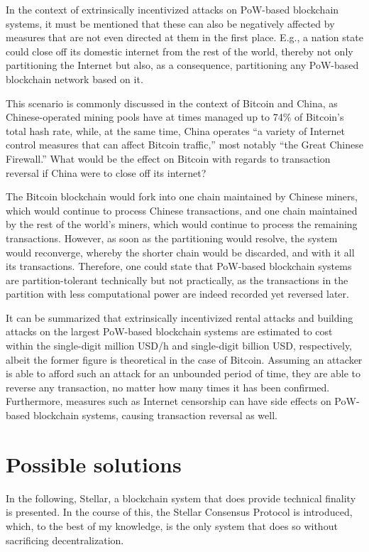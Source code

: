 In the context of extrinsically incentivized attacks on PoW-based blockchain systems, it must be mentioned that these can also be negatively affected by measures that are not even directed at them in the first place.
E.g., a nation state could close off its domestic internet from the rest of the world, thereby not only partitioning the Internet but also, as a consequence, partitioning any PoW-based blockchain network based on it.

This scenario is commonly discussed in the context of Bitcoin and China, as Chinese-operated mining pools have at times managed up to 74\% of Bitcoin's total hash rate, while, at the same time, China operates ``a variety of Internet control measures that can affect Bitcoin traffic,'' most notably ``the Great Chinese Firewall.'' \autocite[5]{kaiser2018}
What would be the effect on Bitcoin with regards to transaction reversal if China were to close off its internet?

The Bitcoin blockchain would fork into one chain maintained by Chinese miners, which would continue to process Chinese transactions, and one chain maintained by the rest of the world's miners, which would continue to process the remaining transactions.
However, as soon as the partitioning would resolve, the system would reconverge, whereby the shorter chain would be discarded, and with it all its transactions.
Therefore, one could state that PoW-based blockchain systems are partition-tolerant technically but not practically, as the transactions in the partition with less computational power are indeed recorded yet reversed later.

It can be summarized that extrinsically incentivized rental attacks and building attacks on the largest PoW-based blockchain systems are estimated to cost within the single-digit million USD/h and single-digit billion USD, respectively, albeit the former figure is theoretical in the case of Bitcoin.
Assuming an attacker is able to afford such an attack for an unbounded period of time, they are able to reverse any transaction, no matter how many times it has been confirmed.
Furthermore, measures such as Internet censorship can have side effects on PoW-based blockchain systems, causing transaction reversal as well.

\section{Possible solutions}

In the following, Stellar, a blockchain system that does provide technical finality is presented.
In the course of this, the Stellar Consensus Protocol is introduced, which, to the best of my knowledge, is the only system that does so without sacrificing decentralization.

